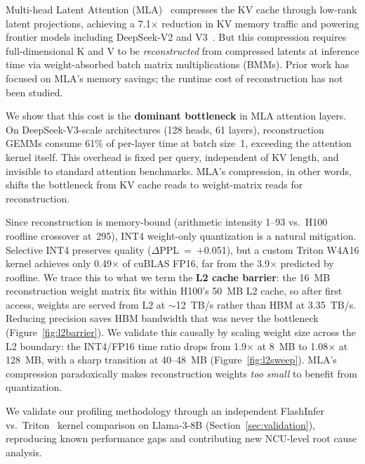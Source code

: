 \documentclass[10pt,twocolumn]{article}
\begin{document}
Multi-head Latent Attention (MLA)~\cite{deepseekv2} compresses the KV cache through low-rank latent projections, achieving a 7.1$\times$ reduction in KV memory traffic and powering frontier models including DeepSeek-V2 and V3~\cite{deepseekv3}.  But this compression requires full-dimensional K and V to be \emph{reconstructed} from compressed latents at inference time via weight-absorbed batch matrix multiplications (BMMs).  Prior work has focused on MLA's memory savings; the runtime cost of reconstruction has not been studied.

We show that this cost is the \textbf{dominant bottleneck} in MLA attention layers.  On DeepSeek-V3-scale architectures (128 heads, 61 layers), reconstruction GEMMs consume 61\% of per-layer time at batch size~1, exceeding the attention kernel itself.  This overhead is fixed per query, independent of KV length, and invisible to standard attention benchmarks.  MLA's compression, in other words, shifts the bottleneck from KV cache reads to weight-matrix reads for reconstruction.

Since reconstruction is memory-bound (arithmetic intensity 1--93 vs.\ H100 roofline crossover at~295), INT4 weight-only quantization is a natural mitigation.  Selective INT4 preserves quality ($\Delta$PPL~=~+0.051), but a custom Triton W4A16 kernel achieves only 0.49$\times$ of cuBLAS FP16, far from the 3.9$\times$ predicted by roofline.  We trace this to what we term the \textbf{L2 cache barrier}: the 16~MB reconstruction weight matrix fits within H100's 50~MB L2 cache, so after first access, weights are served from L2 at ${\sim}$12~TB/s rather than HBM at 3.35~TB/s.  Reducing precision saves HBM bandwidth that was never the bottleneck (Figure~\ref{fig:l2barrier}).  We validate this causally by scaling weight size across the L2 boundary: the INT4/FP16 time ratio drops from 1.9$\times$ at 8~MB to 1.08$\times$ at 128~MB, with a sharp transition at 40--48~MB (Figure~\ref{fig:l2sweep}).  MLA's compression paradoxically makes reconstruction weights \emph{too small} to benefit from quantization.

We validate our profiling methodology through an independent FlashInfer~\cite{flashinfer} vs.\ Triton~\cite{triton} kernel comparison on Llama-3-8B (Section~\ref{sec:validation}), reproducing known performance gaps and contributing new NCU-level root cause analysis.
\end{document}

